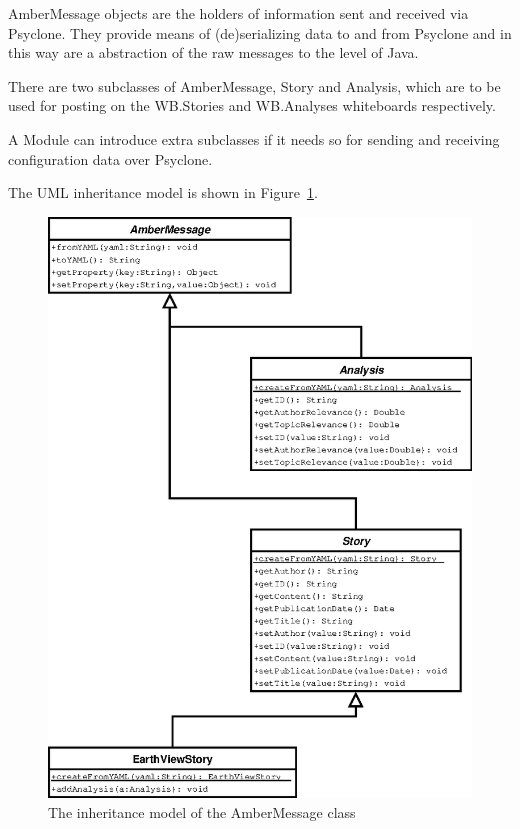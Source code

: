 AmberMessage objects are the holders of information sent and received via
Psyclone. They provide means of (de)serializing data to and from Psyclone and
in this way are a abstraction of the raw messages to the level of Java.

There are two subclasses of AmberMessage, Story and Analysis, which are to be
used for posting on the WB.Stories and WB.Analyses whiteboards respectively.

A Module can introduce extra subclasses if it needs so for sending and
receiving configuration data over Psyclone.

The UML inheritance model is shown in
Figure~\ref{fig:class-diagram-ambermessage}.

\begin{figure}[htp]
  \centering
  \includegraphics{image/class-diagram-ambermessage}
  \caption{
    \label{fig:class-diagram-ambermessage}
    The inheritance model of the AmberMessage class}
\end{figure}

